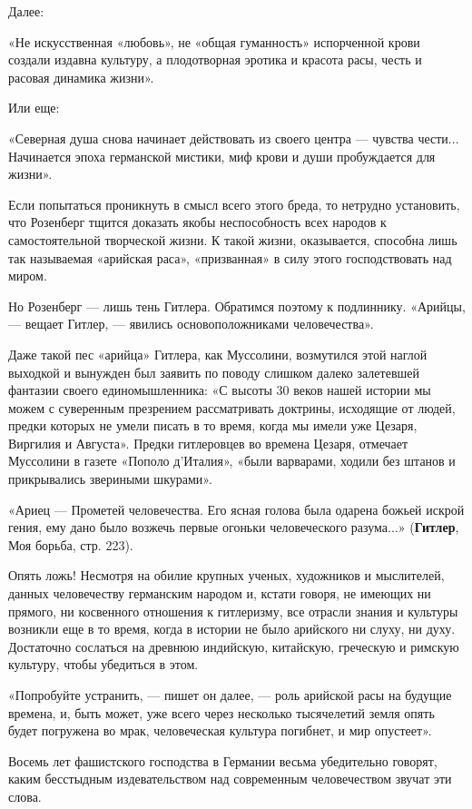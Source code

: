 \documentclass[12pt, a4paper, openany]{book}
\begin{document}
Далее:

«Не искусственная «любовь», не «общая гуманность» испорченной крови создали издавна культуру, а плодотворная эротика и красота расы, честь и расовая динамика жизни».

Или еще:

«Северная душа снова начинает действовать из своего центра — чувства чести... Начинается эпоха германской мистики, миф крови и души пробуждается для жизни».

Если попытаться проникнуть в смысл всего этого бреда, то нетрудно установить, что Розенберг тщится доказать якобы неспособность всех народов к самостоятельной творческой жизни. К такой жизни, оказывается, способна лишь так называемая «арийская раса», «призванная» в силу этого господствовать над миром.

Но Розенберг — лишь тень Гитлера. Обратимся поэтому к подлиннику. «Арийцы, — вещает Гитлер, — явились основоположниками человечества».

Даже такой пес «арийца» Гитлера, как Муссолини, возмутился этой наглой выходкой и вынужден был заявить по поводу слишком далеко залетевшей фантазии своего единомышленника: «С высоты 30 веков нашей истории мы можем с суверенным презрением рассматривать доктрины, исходящие от людей, предки которых не умели писать в то время, когда мы имели уже Цезаря, Виргилия и Августа». Предки гитлеровцев во времена Цезаря, отмечает Муссолини в газете «Пополо д’Италия», «были варварами, ходили без штанов и прикрывались звериными шкурами».

«Ариец — Прометей человечества. Его ясная голова была одарена божьей искрой гения, ему дано было возжечь первые огоньки человеческого разума...» (\textbf{Гитлер}, Моя борьба, стр. 223).

Опять ложь! Несмотря на обилие крупных ученых, художников и мыслителей, данных человечеству германским народом и, кстати говоря, не имеющих ни прямого, ни косвенного отношения к гитлеризму, все отрасли знания и культуры возникли еще в то время, когда в истории не было арийского ни слуху, ни духу. Достаточно сослаться на древнюю индийскую, китайскую, греческую и римскую культуру, чтобы убедиться в этом.

«Попробуйте устранить, — пишет он далее, — роль арийской расы на будущие времена, и, быть может, уже всего через несколько тысячелетий земля опять будет погружена во мрак, человеческая культура погибнет, и мир опустеет».	
	
Восемь лет фашистского господства в Германии весьма убедительно говорят, каким бесстыдным издевательством над современным человечеством звучат эти слова.
\end{document}
